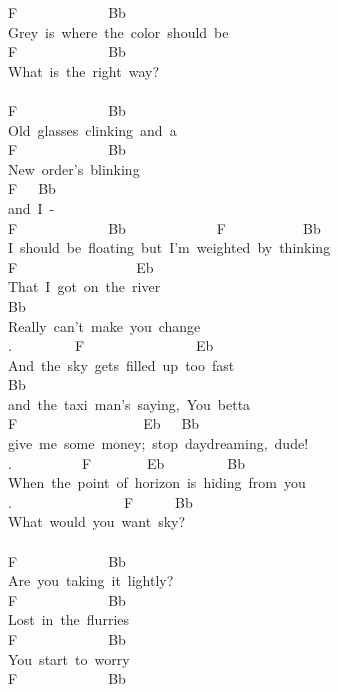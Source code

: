 {F\ \ \ \ \ \ \ \ \ \ \ \ \ Bb\\
Grey\ is\ where\ the\ color\ should\ be\\
F\ \ \ \ \ \ \ \ \ \ \ \ \ Bb\\
What\ is\ the\ right\ way?\\
\\
F\ \ \ \ \ \ \ \ \ \ \ \ \ Bb\\
Old\ glasses\ clinking\ and\ a\\
F\ \ \ \ \ \ \ \ \ \ \ \ \ Bb\\
New\ order's\ blinking\\
F\ \ \ Bb\\
and\ I\ -\\
F\ \ \ \ \ \ \ \ \ \ \ \ \ Bb\ \ \ \ \ \ \ \ \ \ \ \ \ F\ \ \ \ \ \ \ \ \ \ \ Bb\\
I\ should\ be\ floating\ but\ I'm\ weighted\ by\ thinking\\
F\ \ \ \ \ \ \ \ \ \ \ \ \ \ \ \ \ Eb\\
That\ I\ got\ on\ the\ river\\
Bb\\
Really\ can't\ make\ you\ change\\
.\ \ \ \ \ \ \ \ \ F\ \ \ \ \ \ \ \ \ \ \ \ \ \ \ \ Eb\\
And\ the\ sky\ gets\ filled\ up\ too\ fast\\
Bb\\
and\ the\ taxi\ man's\ saying,\ \;You\ betta\\
F\ \ \ \ \ \ \ \ \ \ \ \ \ \ \ \ \ \ Eb\ \ \ Bb\\
give\ me\ some\ money;\ stop\ daydreaming,\ dude!\;\\
.\ \ \ \ \ \ \ \ \ \ F\ \ \ \ \ \ \ \ Eb\ \ \ \ \ \ \ \ \ Bb\\
When\ the\ point\ of\ horizon\ is\ hiding\ from\ you\\
.\ \ \ \ \ \ \ \ \ \ \ \ \ \ \ \ F\ \ \ \ \ \ Bb\\
What\ would\ you\ want\ sky?\\
\\
F\ \ \ \ \ \ \ \ \ \ \ \ \ Bb\\
Are\ you\ taking\ it\ lightly?\\
F\ \ \ \ \ \ \ \ \ \ \ \ \ Bb\\
Lost\ in\ the\ flurries\\
F\ \ \ \ \ \ \ \ \ \ \ \ \ Bb\\
You\ start\ to\ worry\\
F\ \ \ \ \ \ \ \ \ \ \ \ \ Bb\\
}
